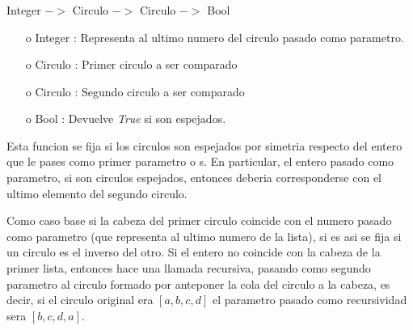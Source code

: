 \documentclass[10pt,journal]{IEEEtran}
\begin{document}
\subsubsection{\color{Red}{circulosEspejadosAux}}
\begin{description}[style=nextline]
        \item[\color{Green}{Signatura}] Integer $->$ Circulo $->$ Circulo $->$ Bool
        \begin{itemize} 
        \item [o] Integer : Representa al ultimo numero del circulo pasado como parametro. 
        \item [o] Circulo : Primer circulo a ser comparado
        \item [o] Circulo : Segundo circulo a ser comparado
        \item [o] Bool : Devuelve \textit{True} si son espejados.
        \end{itemize}        
        
        \item[\color{Green}{Descripción}] Esta funcion se fija si los circulos son espejados por simetria respecto del entero que le pases como primer parametro o s. En particular, el entero pasado como parametro, si son circulos espejados, entonces deberia corresponderse con el ultimo elemento del segundo circulo.
        
        Como caso base si la cabeza del primer circulo coincide con el numero pasado como parametro (que representa al ultimo numero de la lista), si es asi se fija si un circulo es el inverso del otro. Si el entero no coincide con la cabeza de la primer lista, entonces hace una llamada recursiva, pasando como segundo parametro al circulo formado por anteponer la cola del circulo a la cabeza, es decir, si el circulo original era $[a,b,c,d]$ el parametro pasado como recursividad sera $[b,c,d,a]$.
\end{description}
\end{document}
